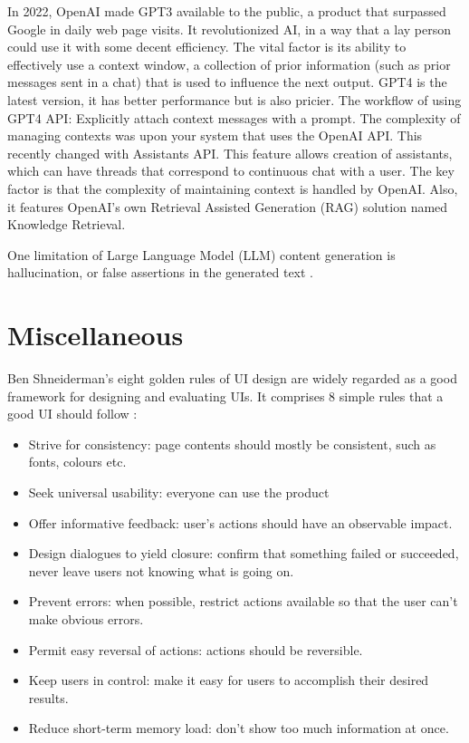  In 2022, OpenAI made GPT3 available to the public, a product that surpassed Google in daily web page visits. It revolutionized AI, in a way that a lay person could use it with some decent efficiency. The vital factor is its ability to effectively use a context window, a collection of prior information (such as prior messages sent in a chat) that is used to influence the next output. GPT4 is the latest version, it has better performance but is also pricier. The workflow of using GPT4 API: Explicitly attach context messages with a prompt. The complexity of managing contexts was upon your system that uses the OpenAI API. This recently changed with Assistants API. This feature allows creation of assistants, which can have threads that correspond to continuous chat with a user. The key factor is that the complexity of maintaining context is handled by OpenAI. Also, it features OpenAI's own Retrieval Assisted Generation (RAG) solution named Knowledge Retrieval. 

 One limitation of Large Language Model (LLM) content generation is hallucination, or false assertions in the generated text \cite{ji2023survey}.

\section{Miscellaneous}
\label{section:goldenRules}
Ben Shneiderman's eight golden rules of UI design are widely regarded as a good framework for designing and evaluating UIs. It comprises 8 simple rules that a good UI should follow \cite{goldenRulesUI}: \begin{itemize}
    \item Strive for consistency: page contents should mostly be consistent, such as fonts, colours etc. 
    \item Seek universal usability: everyone can use the product
    \item Offer informative feedback: user's actions should have an observable impact.
    \item Design dialogues to yield closure: confirm that something failed or succeeded, never leave users not knowing what is going on.
    \item Prevent errors: when possible, restrict actions available so that the user can't make obvious errors.
    \item Permit easy reversal of actions: actions should be reversible.
    \item Keep users in control: make it easy for users to accomplish their desired results.
    \item Reduce short-term memory load: don't show too much information at once.
\end{itemize}

